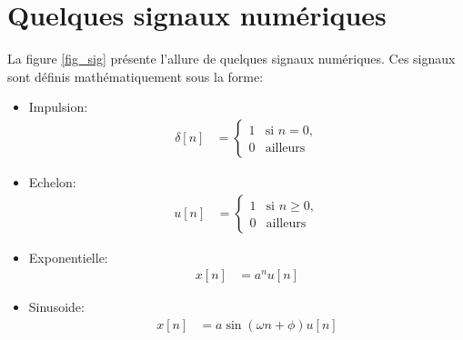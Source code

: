 \documentclass[11pt,a4paper]{IEEEtran}
\begin{document}
 
\appendices

\section{Quelques signaux numériques}
\label{app_sig}
La figure \ref{fig_sig} présente l'allure de quelques signaux numériques. Ces signaux sont définis mathématiquement sous la forme:
\begin{itemize}
\item Impulsion:
\begin{align*}
\delta[n]&=\left\{\begin{array}{cc} 1&\textrm{si }n=0,\\
0 &\textrm{ailleurs }\end{array}\right.
\end{align*}
\item Echelon:
\begin{align*}
u[n]&=\left\{\begin{array}{cc} 1&\textrm{si }n\ge 0,\\
0 &\textrm{ailleurs }\end{array}\right.
\end{align*}
\item Exponentielle:
\begin{align*}
x[n]&=a^{n} u[n]
\end{align*}
\item Sinusoide:
\begin{align*}
x[n]&=a \sin(\omega n+\phi) u[n]
\end{align*}
\end{itemize}
\end{document}
